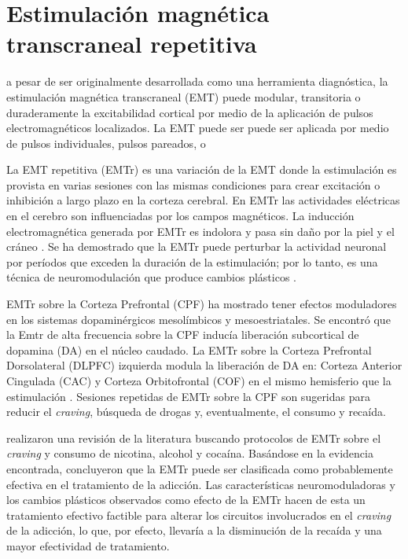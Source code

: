 \section{Estimulación magnética transcraneal repetitiva}
a pesar de ser originalmente desarrollada como una herramienta diagnóstica, la estimulación magnética transcraneal (EMT) puede modular, transitoria \textemdash{}o duraderamente\textemdash{} la excitabilidad cortical por medio de la aplicación de pulsos electromagnéticos localizados\parencite{Horvath2011a}. La EMT puede ser puede ser aplicada por medio de pulsos individuales, pulsos pareados, o

La EMT repetitiva (EMTr) es una variación de la EMT donde la estimulación es provista en varias sesiones con las mismas condiciones para crear excitación o inhibición a largo plazo en la corteza cerebral.
En EMTr las actividades eléctricas en el cerebro son influenciadas por los campos magnéticos. La inducción electromagnética generada por EMTr es indolora y pasa sin daño por la piel y el cráneo \parencite{Noohi2016}.
Se ha demostrado que la EMTr puede perturbar la actividad neuronal por períodos que exceden la duración de la estimulación; por lo tanto, es una técnica de neuromodulación que produce cambios plásticos \parencite{Horvath2011a}.\par
EMTr sobre la Corteza Prefrontal (CPF) ha mostrado tener efectos moduladores en los sistemas dopaminérgicos mesolímbicos y mesoestriatales.
Se encontró que la Emtr de alta frecuencia sobre la CPF inducía liberación subcortical de dopamina (DA) en el núcleo caudado\parencite{Strafella2001}.
La EMTr sobre la Corteza Prefrontal Dorsolateral (DLPFC) izquierda modula la liberación de DA en: Corteza Anterior Cingulada (CAC) y Corteza Orbitofrontal (COF) en el mismo hemisferio que la estimulación \parencite{Cho2009}.
Sesiones repetidas de EMTr sobre la CPF son sugeridas para reducir el \textit{craving}, búsqueda de drogas y, eventualmente, el consumo y recaída\parencite{Amiaz2009}.\par
\textcite{Bellamoli2014a} realizaron una revisión de la literatura buscando protocolos de EMTr sobre el \textit{craving} y consumo de nicotina, alcohol y cocaína. Basándose en la evidencia encontrada, concluyeron que la EMTr puede ser clasificada como probablemente efectiva en el tratamiento de la adicción.
Las características neuromoduladoras y los cambios plásticos observados como efecto de la EMTr hacen de esta un tratamiento efectivo factible para alterar los circuitos involucrados en el \textit{craving} de la adicción, lo que, por efecto, llevaría a la disminución de la recaída y una mayor efectividad de tratamiento.



